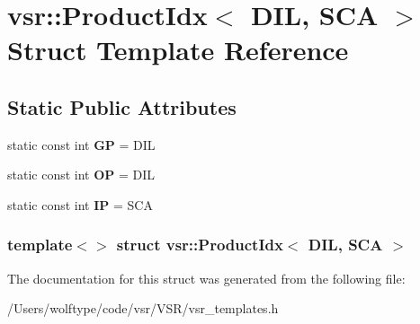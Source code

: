\hypertarget{structvsr_1_1_product_idx_3_01_d_i_l_00_01_s_c_a_01_4}{\section{vsr\-:\-:Product\-Idx$<$ D\-I\-L, S\-C\-A $>$ Struct Template Reference}
\label{structvsr_1_1_product_idx_3_01_d_i_l_00_01_s_c_a_01_4}
}
\subsection*{Static Public Attributes}
\begin{DoxyCompactItemize}
\item 
\hypertarget{structvsr_1_1_product_idx_3_01_d_i_l_00_01_s_c_a_01_4_a06511b0134be561bd9d16ea2e13e16cf}{static const int {\bfseries G\-P} = D\-I\-L}\label{structvsr_1_1_product_idx_3_01_d_i_l_00_01_s_c_a_01_4_a06511b0134be561bd9d16ea2e13e16cf}

\item 
\hypertarget{structvsr_1_1_product_idx_3_01_d_i_l_00_01_s_c_a_01_4_a2b7acdeff4d673d9dccfac4f44bebd79}{static const int {\bfseries O\-P} = D\-I\-L}\label{structvsr_1_1_product_idx_3_01_d_i_l_00_01_s_c_a_01_4_a2b7acdeff4d673d9dccfac4f44bebd79}

\item 
\hypertarget{structvsr_1_1_product_idx_3_01_d_i_l_00_01_s_c_a_01_4_afcfc858cd0dc353d4514b8743de084be}{static const int {\bfseries I\-P} = S\-C\-A}\label{structvsr_1_1_product_idx_3_01_d_i_l_00_01_s_c_a_01_4_afcfc858cd0dc353d4514b8743de084be}

\end{DoxyCompactItemize}
\subsubsection*{template$<$$>$ struct vsr\-::\-Product\-Idx$<$ D\-I\-L, S\-C\-A $>$}



The documentation for this struct was generated from the following file\-:\begin{DoxyCompactItemize}
\item 
/\-Users/wolftype/code/vsr/\-V\-S\-R/vsr\-\_\-templates.\-h\end{DoxyCompactItemize}
